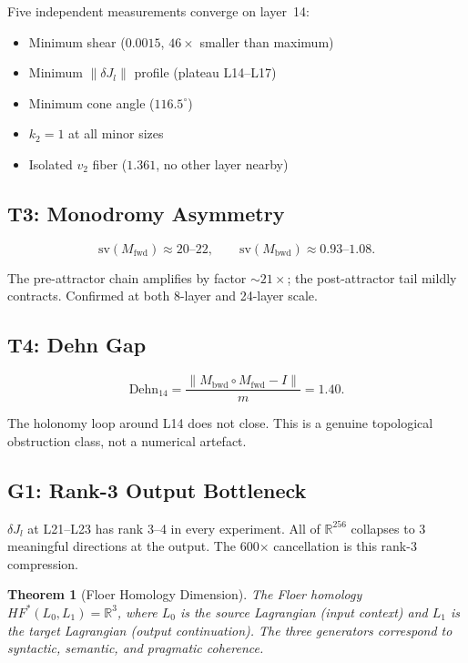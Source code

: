 \documentclass[11pt,a4paper]{article}
\newtheorem{theorem}{Theorem}
\begin{document}
Five independent measurements converge on layer~14:
\begin{itemize}
  \item Minimum shear ($0.0015$, $46{\times}$ smaller than maximum)
  \item Minimum $\|\delta J_l\|$ profile (plateau L14--L17)
  \item Minimum cone angle ($116.5^\circ$)
  \item $k_2 = 1$ at all minor sizes
  \item Isolated $v_2$ fiber ($1.361$, no other layer nearby)
\end{itemize}

\subsection{T3: Monodromy Asymmetry}

\[
\text{sv}(M_\text{fwd}) \approx 20\text{--}22, \qquad
\text{sv}(M_\text{bwd}) \approx 0.93\text{--}1.08.
\]

The pre-attractor chain amplifies by factor ${\sim}21{\times}$; the
post-attractor tail mildly contracts. Confirmed at both 8-layer and 24-layer
scale.

\subsection{T4: Dehn Gap}

\[
\text{Dehn}_{14} = \frac{\|M_\text{bwd} \circ M_\text{fwd} - I\|}{m} = 1.40.
\]

The holonomy loop around L14 does not close. This is a genuine topological
obstruction class, not a numerical artefact.

\subsection{G1: Rank-3 Output Bottleneck}

$\delta J_l$ at L21--L23 has rank 3--4 in every experiment. All of
$\mathbb{R}^{256}$ collapses to 3 meaningful directions at the output.
The 600$\times$ cancellation is this rank-3 compression.

\begin{theorem}[Floer Homology Dimension]
The Floer homology $HF^*(L_0, L_1) = \mathbb{R}^3$, where $L_0$ is the
source Lagrangian (input context) and $L_1$ is the target Lagrangian
(output continuation).  The three generators correspond to syntactic,
semantic, and pragmatic coherence.
\end{theorem}
\end{document}
